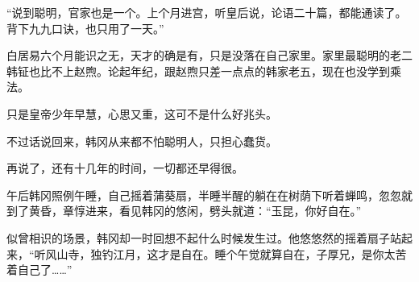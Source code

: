 “说到聪明，官家也是一个。上个月进宫，听皇后说，论语二十篇，都能通读了。背下九九口诀，也只用了一天。”

白居易六个月能识之无，天才的确是有，只是没落在自己家里。家里最聪明的老二韩钲也比不上赵煦。论起年纪，跟赵煦只差一点点的韩家老五，现在也没学到乘法。

只是皇帝少年早慧，心思又重，这可不是什么好兆头。

不过话说回来，韩冈从来都不怕聪明人，只担心蠢货。

再说了，还有十几年的时间，一切都还早得很。

午后韩冈照例午睡，自己摇着蒲葵扇，半睡半醒的躺在在树荫下听着蝉鸣，忽忽就到了黄昏，章惇进来，看见韩冈的悠闲，劈头就道：“玉昆，你好自在。”

似曾相识的场景，韩冈却一时回想不起什么时候发生过。他悠悠然的摇着扇子站起来，“听风山寺，独钓江月，这才是自在。睡个午觉就算自在，子厚兄，是你太苦着自己了……”

